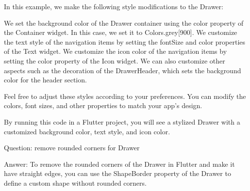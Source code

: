 In this example, we make the following style modifications to the Drawer:

We set the background color of the Drawer container using the color property of the Container widget. In this case, 
we set it to Colors.grey[900].
We customize the text style of the navigation items by setting the fontSize and color properties of the Text widget.
We customize the icon color of the navigation items by setting the color property of the Icon widget.
We can also customize other aspects such as the decoration of the DrawerHeader, which sets the background color for
the header section.

Feel free to adjust these styles according to your preferences. You can modify the colors, font sizes, and other 
properties to match your app's design.

By running this code in a Flutter project, you will see a stylized Drawer with a customized background color, text 
style, and icon color.

Question: remove rounded corners for Drawer

Answer: To remove the rounded corners of the Drawer in Flutter and make it have straight edges, you can use the 
ShapeBorder property of the Drawer to define a custom shape without rounded corners.

